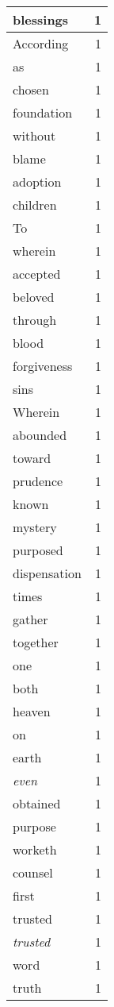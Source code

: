 \begin{center}
\begin{longtable}{l|r}
blessings & 1\\ \hline 
According & 1\\ \hline 
as & 1\\ \hline 
chosen & 1\\ \hline 
foundation & 1\\ \hline 
without & 1\\ \hline 
blame & 1\\ \hline 
adoption & 1\\ \hline 
children & 1\\ \hline 
To & 1\\ \hline 
wherein & 1\\ \hline 
accepted & 1\\ \hline 
beloved & 1\\ \hline 
through & 1\\ \hline 
blood & 1\\ \hline 
forgiveness & 1\\ \hline 
sins & 1\\ \hline 
Wherein & 1\\ \hline 
abounded & 1\\ \hline 
toward & 1\\ \hline 
prudence & 1\\ \hline 
known & 1\\ \hline 
mystery & 1\\ \hline 
purposed & 1\\ \hline 
dispensation & 1\\ \hline 
times & 1\\ \hline 
gather & 1\\ \hline 
together & 1\\ \hline 
one & 1\\ \hline 
both & 1\\ \hline 
heaven & 1\\ \hline 
on & 1\\ \hline 
earth & 1\\ \hline 
\emph{even} & 1\\ \hline 
obtained & 1\\ \hline 
purpose & 1\\ \hline 
worketh & 1\\ \hline 
counsel & 1\\ \hline 
first & 1\\ \hline 
trusted & 1\\ \hline 
\emph{trusted} & 1\\ \hline 
word & 1\\ \hline 
truth & 1\\ \hline 

\end{longtable}
\end{center}
